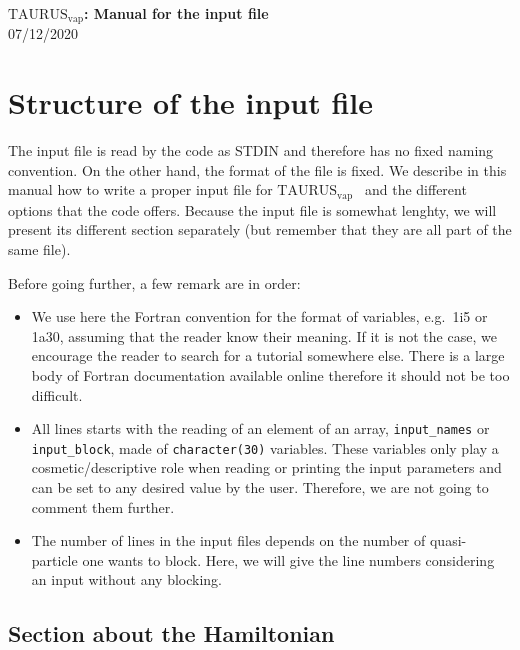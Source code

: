 \documentclass[a4paper,11pt]{article}
\newcommand{\TAURUSvap}{$\text{TAURUS}_{\text{vap}}$}
\newcommand{\ttt}[1]{\texttt{#1}}
\begin{document}
%
% 
\begin{center}
 {\LARGE \textbf{\TAURUSvap: Manual for the input file}} \\
 {\large 07/12/2020}
\end{center}

%
% 
\section{Structure of the input file}

The input file is read by the code as STDIN and therefore has no fixed naming convention. 
On the other hand, the format of the file is fixed. We describe in this manual how to write a proper input file for \TAURUSvap~
and the different options that the code offers.
Because the input file is somewhat lenghty, we will present its different section separately (but remember that they
are all part of the same file).
 
\noindent Before going further, a few remark are in order:
\begin{itemize}
  \item We use here the Fortran convention for the format of variables, e.g.\ 1i5 or 1a30, assuming that the reader
  know their meaning. If it is not the case, we encourage the reader to search for a tutorial somewhere else.
  There is a large body of Fortran documentation available online therefore it should not be too difficult.

  \item All lines starts with the reading of an element of an array, \ttt{input\_names} or \ttt{input\_block},
  made of \ttt{character(30)} variables. 
  These variables only play a cosmetic/descriptive role when reading or printing the input parameters and can be
  set to any desired value by the user. Therefore, we are not going to comment them further.

  \item The number of lines in the input files depends on the number of quasi-particle one wants to block. Here, we will give
  the line numbers considering an input without any blocking.
\end{itemize}

%
%
\subsection{Section about the Hamiltonian}
\end{document}
